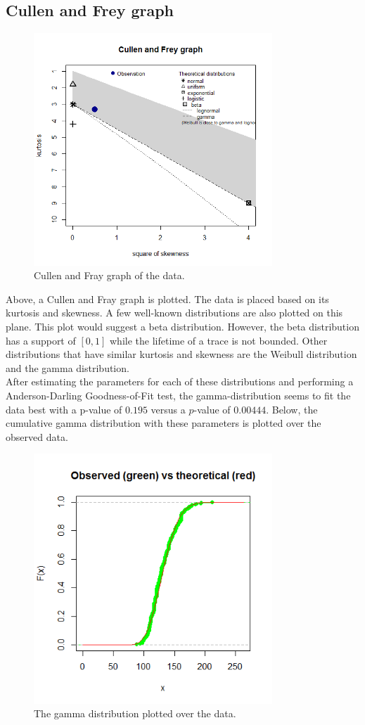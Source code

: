 \subsection{Cullen and Frey graph}
\begin{figure}[H]
\centering
\includegraphics[width=0.8\textwidth]{Plots/CullenAndFray.png}
\caption{Cullen and Fray graph of the data.}
\end{figure}
Above, a Cullen and Fray graph is plotted. The data is placed based on its kurtosis and skewness. A few well-known distributions are also plotted on this plane. This plot would suggest a beta distribution. However, the beta distribution has a support of $[0,1]$ while the lifetime of a trace is not bounded. Other distributions that have similar kurtosis and skewness are the Weibull distribution and the gamma distribution.\\
After estimating the parameters for each of these distributions and performing a Anderson-Darling Goodness-of-Fit test, the gamma-distribution seems to fit the data best with a p-value of $0.195$ versus a $p$-value of $0.00444$. Below, the cumulative gamma distribution with these parameters is plotted over the observed data.
\begin{figure}[H]
\centering
\includegraphics[width=0.8\textwidth]{Plots/GammaCDF.png}
\caption{The gamma distribution plotted over the data.}
\end{figure}